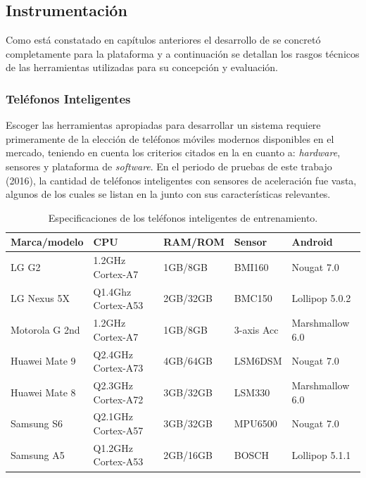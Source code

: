 \subsection{Instrumentación}

\label{ssec6:instrumentacion}Como está constatado en capítulos anteriores
el desarrollo de \emph{ }se concretó completamente
para la plataforma \emph{ }y a continuación se detallan
los rasgos técnicos de las herramientas utilizadas para su concepción
y evaluación.

\subsubsection{Teléfonos Inteligentes}

Escoger las herramientas apropiadas para desarrollar un sistema 
requiere primeramente de la elección de teléfonos móviles modernos
disponibles en el mercado, teniendo en cuenta los criterios citados
en la  en cuanto a: \emph{hardware},
sensores y plataforma de \emph{software}. En el periodo de pruebas
de este trabajo (2016), la cantidad de teléfonos inteligentes con
sensores de aceleración fue vasta, algunos de los cuales se listan
en la  junto con sus características relevantes.

\begin{table}[h]
\begin{centering}
\begin{tabular}{|l|>{\raggedright}p{2.5cm}|l|>{\raggedright}p{2cm}|l|}
\hline 
Marca/modelo & CPU & RAM/ROM & Sensor & Android\tabularnewline
\hline 
\hline 
LG G2 & 1.2GHz Cortex-A7 & 1GB/8GB & BMI160 & Nougat 7.0\tabularnewline
\hline 
LG Nexus 5X & Q1.4Ghz Cortex-A53 & 2GB/32GB & BMC150 & Lollipop 5.0.2\tabularnewline
\hline 
Motorola G 2nd & 1.2GHz Cortex-A7 & 1GB/8GB & 3-axis Acc & Marshmallow 6.0\tabularnewline
\hline 
Huawei Mate 9 & Q2.4GHz Cortex-A73 & 4GB/64GB & LSM6DSM & Nougat 7.0\tabularnewline
\hline 
Huawei Mate 8 & Q2.3GHz Cortex-A72 & 3GB/32GB & LSM330  & Marshmallow 6.0\tabularnewline
\hline 
Samsung S6 & Q2.1GHz Cortex-A57 & 3GB/32GB & MPU6500 & Nougat 7.0\tabularnewline
\hline 
Samsung A5 & Q1.2GHz Cortex-A53  & 2GB/16GB & BOSCH & Lollipop 5.1.1\tabularnewline
\hline 
\end{tabular}
\par\end{centering}
\caption[Especificaciones de teléfonos inteligentes]{\label{tab6:dispositivos}Especificaciones de los teléfonos inteligentes
de entrenamiento.}
\end{table}

